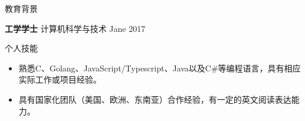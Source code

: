 \documentclass{resume} %
\begin{document}

\begin{rSection}{教育背景}

  {\bf 工学学士} 计算机科学与技术 \hfill {Jane 2017}

\end{rSection}

\begin{rSection}{个人技能}
  \begin{itemize}
    \itemsep -3pt {}
    \item 熟悉C、Golang、JavaScript/Typescript、Java以及C\#等编程语言，具有相应实际工作或项目经验。
    \item 具有国家化团队（美国、欧洲、东南亚）合作经验，有一定的英文阅读表达能力。
  \end{itemize}
\end{rSection}
\end{document}
